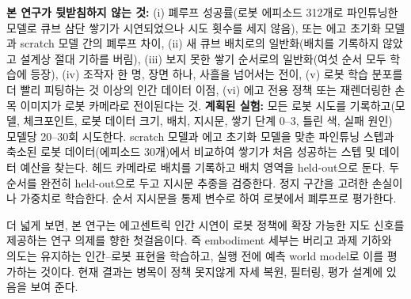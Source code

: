 \documentclass[conference,10pt]{IEEEtran}
\begin{document}
\textbf{본 연구가 뒷받침하지 않는 것:} (i) 폐루프 성공률(로봇 에피소드 312개로 파인튜닝한 모델로 큐브 삼단 쌓기가 시연되었으나 시도
횟수를 세지 않음), 또는 에고 초기화 모델과 scratch 모델 간의 폐루프 차이, (ii) 새 큐브 배치로의 일반화(배치를 기록하지 않았고 설계상
절대 기하를 버림), (iii) 보지 못한 쌓기 순서로의 일반화(여섯 순서 모두 학습에 등장), (iv) 조작자 한 명, 장면 하나, 사흘을 넘어서는 전이,
(v) 로봇 학습 분포를 더 빨리 피팅하는 것 이상의 인간 데이터 이점, (vi) 에고 전용 정책 또는 재렌더링한 손목 이미지가 로봇 카메라로 전이된다는
것. \textbf{계획된 실험:} 모든 로봇 시도를 기록하고(모델, 체크포인트, 로봇 데이터 크기, 배치, 지시문, 쌓기 단계 0--3, 틀린 색, 실패 원인)
모델당 20--30회 시도한다. scratch 모델과 에고 초기화 모델을 맞춘 파인튜닝 스텝과 축소된 로봇 데이터(에피소드 30개)에서 비교하여 쌓기가
처음 성공하는 스텝 및 데이터 예산을 찾는다. 헤드 카메라로 배치를 기록하고 배치 영역을 held-out으로 둔다. 두 순서를 완전히 held-out으로
두고 지시문 추종을 검증한다. 정지 구간을 고려한 손실이나 가중치로 학습한다. 순서 지시문을 통제 변수로 하여 로봇에서 폐루프로 평가한다.

더 넓게 보면, 본 연구는 에고센트릭 인간 시연이 로봇 정책에 확장 가능한 지도 신호를 제공하는 연구 의제를 향한 첫걸음이다. 즉 embodiment
세부는 버리고 과제 기하와 의도는 유지하는 인간--로봇 표현을 학습하고, 실행 전에 예측 world model로 이를 평가하는 것이다. 현재 결과는
병목이 정책 못지않게 자세 복원, 필터링, 평가 설계에 있음을 보여 준다.
\end{document}
